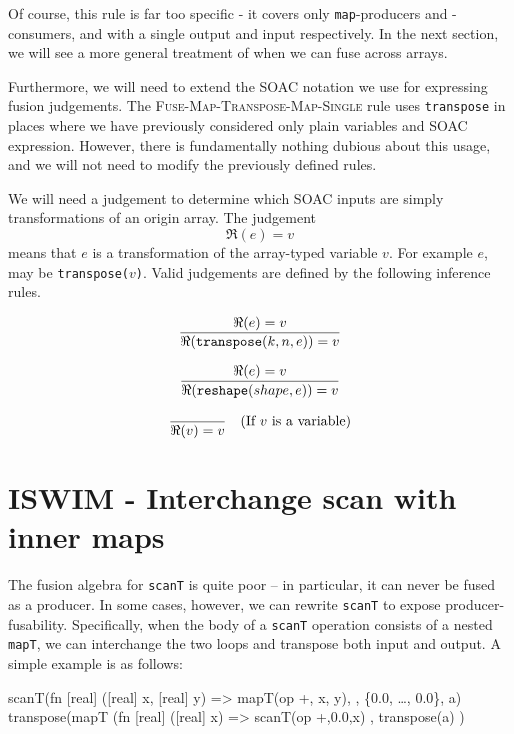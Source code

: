 Of course, this rule is far too specific - it covers only
\texttt{map}-producers and -consumers, and with a single output and
input respectively.  In the next section, we will see a more general
treatment of when we can fuse across arrays.

Furthermore, we will need to extend the SOAC notation we use for
expressing fusion judgements.  The
\textsc{Fuse-Map-Transpose-Map-Single} rule uses \texttt{transpose} in
places where we have previously considered only plain variables and
SOAC expression.  However, there is fundamentally nothing dubious
about this usage, and we will not need to modify the previously
defined rules.

We will need a judgement to determine which SOAC inputs are simply
transformations of an origin array.  The judgement
\[
\boxed{
  \Re(e) = v
}
\]
means that $e$ is a transformation of the array-typed variable $v$.
For example $e$, may be \texttt{transpose($v$)}.  Valid judgements are
defined by the following inference rules.

\begin{align*}
\frac{\displaystyle{
  \Re(e) = v
}}{\displaystyle{
  \Re(\texttt{transpose}(k,n,e)) = v
}}
\end{align*}

\begin{align*}
\frac{\displaystyle{
  \Re(e) = v
}}{\displaystyle{
  \Re(\texttt{reshape}(shape,e)) = v
}}
\end{align*}

\begin{align*}
  \frac{\displaystyle{
  }}{\displaystyle{
    \Re(v) = v
}} \quad (\mbox{If $v$ is a variable})
\end{align*}

\section{ISWIM - Interchange scan with inner maps}

The fusion algebra for \texttt{scanT} is quite poor -- in particular,
it can never be fused as a producer.  In some cases, however, we can
rewrite \texttt{scanT} to expose producer-fusability.  Specifically,
when the body of a \texttt{scanT} operation consists of a nested
\texttt{mapT}, we can interchange the two loops and transpose both
input and output.  A simple example is as follows:

\begin{colorcode}
scanT(fn [real] ([real] x, [real] y) =>
        mapT(op +, x, y),
     , \{0.0, \ldots, 0.0\}, a)   \emphh{\mymath{\equiv}}
transpose(mapT (fn [real] ([real] x) =>
                  scanT(op +,0.0,x)
               , transpose(a) )
\end{colorcode}

